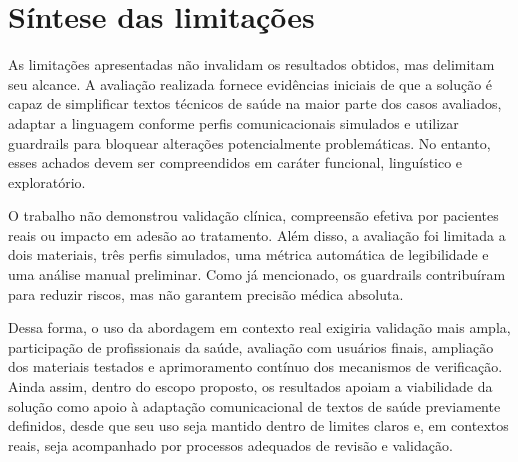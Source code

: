 \section{Síntese das limitações}
\label{sec:sintese-limitacoes}

As limitações apresentadas não invalidam os resultados obtidos, mas delimitam seu alcance. A avaliação realizada fornece evidências iniciais de que a solução é capaz de simplificar textos técnicos de saúde na maior parte dos casos avaliados, adaptar a linguagem conforme perfis comunicacionais simulados e utilizar guardrails para bloquear alterações potencialmente problemáticas. No entanto, esses achados devem ser compreendidos em caráter funcional, linguístico e exploratório.

O trabalho não demonstrou validação clínica, compreensão efetiva por pacientes reais ou impacto em adesão ao tratamento. Além disso, a avaliação foi limitada a dois materiais, três perfis simulados, uma métrica automática de legibilidade e uma análise manual preliminar. Como já mencionado, os guardrails contribuíram para reduzir riscos, mas não garantem precisão médica absoluta.

Dessa forma, o uso da abordagem em contexto real exigiria validação mais ampla, participação de profissionais da saúde, avaliação com usuários finais, ampliação dos materiais testados e aprimoramento contínuo dos mecanismos de verificação. Ainda assim, dentro do escopo proposto, os resultados apoiam a viabilidade da solução como apoio à adaptação comunicacional de textos de saúde previamente definidos, desde que seu uso seja mantido dentro de limites claros e, em contextos reais, seja acompanhado por processos adequados de revisão e validação.
